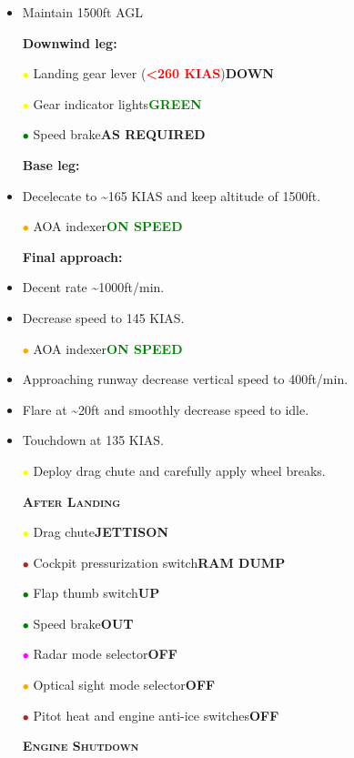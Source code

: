 \documentclass[a4paper,12pt,dvipsnames]{letter}
\newcommand{\button}[1]{\textbf{#1}}
\newcommand{\ok}[1]{\textcolor{Green}{\textbf{#1}}}
\newcommand{\warn}[1]{\textcolor{Red}{\textbf{#1}}}
\newcommand{\myHead}[1]{{\LARGE\textsc{\textbf{#1}}}}
\newcommand{\gi}{\textcolor{Green}{$\bullet$\;}}
\newcommand{\yi}{\textcolor{Yellow}{$\bullet$\;}}
\newcommand{\mi}{\textcolor{Magenta}{$\bullet$\;}}
\newcommand{\oi}{\textcolor{Orange}{$\bullet$\;}}
\renewcommand{\ni}{\textcolor{Brown}{$\bullet$\;}}
\newcommand{\tb}[1]{\textbf{#1}}
\begin{document}
{\begin{itemize}
 \item Maintain 1500\;ft AGL
 \item[] \tb{Downwind leg:}
 \item[\yi] Landing gear lever (\warn{<260 KIAS})\dotfill\button{DOWN}
 \item[\yi] Gear indicator lights\dotfill\ok{GREEN}
 \item[\gi] Speed brake\dotfill\button{AS REQUIRED}
 \item[] \tb{Base leg:}
 \item Decelecate to \textasciitilde165 KIAS and keep altitude of 1500\;ft.
 \item[\oi] AOA indexer\dotfill\ok{ON SPEED}
 \item[] \tb{Final approach:}
 \item Decent rate \textasciitilde1000\;ft/min.
 \item Decrease speed to 145 KIAS.
 \item[\oi] AOA indexer\dotfill\ok{ON SPEED}
 \item Approaching runway decrease vertical speed to 400\;ft/min.
 \item Flare at \textasciitilde20\;ft and smoothly decrease speed to idle.
 \item Touchdown at 135 KIAS.
 \item[\yi] Deploy drag chute and carefully apply wheel breaks.
\end{itemize}
\newpage
\begin{itemize}
 \item[] \myHead{After Landing}
 \item[\yi] Drag chute\dotfill\button{JETTISON}
 \item[\ni] Cockpit pressurization switch\dotfill\button{RAM DUMP}
 \item[\gi] Flap thumb switch\dotfill\button{UP}
 \item[\gi] Speed brake\dotfill\button{OUT}
 \item[\mi] Radar mode selector\dotfill\button{OFF}
 \item[\oi] Optical sight mode selector\dotfill\button{OFF}
 \item[\ni] Pitot heat and engine anti-ice switches\dotfill\button{OFF}
\end{itemize}
\begin{itemize}
 \item[] \myHead{Engine Shutdown}

\end{itemize}}
\end{document}
